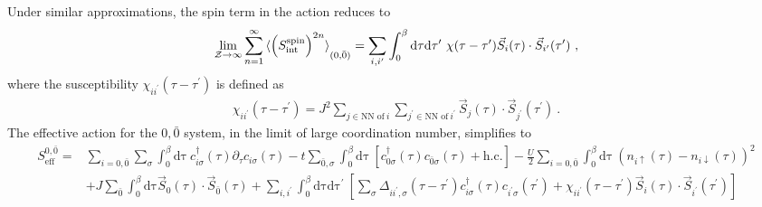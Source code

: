\documentclass[reprint,hidelinks,onecolumn]{revtex4-2}
\begin{document}
Under similar approximations, the spin term in the action reduces to
\begin{equation}\begin{aligned}
	\lim_{\mathcal{Z}\to \infty}\sum_{n=1}^\infty \braket{\left(S_\text{int}^\text{spin}\right)^{2n}}_{(0,{\bar 0})} = \sum_{i,i^\prime}\int_0^\beta\mathrm{d\tau}\mathrm{d\tau^\prime}~\chi(\tau - \tau^\prime)\vec{S}_{i}(\tau)\cdot\vec{S}_{i^\prime}(\tau^\prime)~,
\end{aligned}\end{equation}
where the susceptibility \(\chi_{ii^\prime}(\tau - \tau^\prime)\) is defined as 
\begin{equation}\begin{aligned}
	\chi_{ii^\prime}(\tau - \tau^\prime) = J^2\sum_{j \in \text{NN of}~i}\sum_{j^\prime \in \text{NN of}~i^\prime}\vec{S}_{j}(\tau)\cdot\vec{S}_{j^\prime}(\tau^\prime)~.
\end{aligned}\end{equation}
The effective action for the \(0,\bar 0\) system, in the limit of large coordination number, simplifies to
\begin{equation}\begin{aligned}
	S^{0,{\bar 0}}_\text{eff} =& \sum_{i=0,{\bar 0}}\sum_\sigma \int_0^\beta\mathrm{d\tau}~c^\dagger_{i\sigma}(\tau)\partial_\tau c_{i\sigma}(\tau)  - t\sum_{{\bar 0},\sigma}\int_0^\beta\mathrm{d\tau}~\left[c^\dagger_{0\sigma}(\tau)c_{{\bar 0}\sigma}(\tau) + \text{h.c.}\right] - \frac{U}{2}\sum_{i=0,{\bar 0}}\int_0^\beta\mathrm{d\tau}~\left(n_{i \uparrow}(\tau) - n_{i \downarrow}(\tau)\right)^2 \\
				   &+ J\sum_{{\bar 0}}\int_0^\beta\mathrm{d\tau} \vec{S}_0(\tau)\cdot\vec{S}_{{\bar 0}}(\tau) + \sum_{i,i^\prime}\int_0^\beta\mathrm{d\tau}\mathrm{d\tau^\prime}~\left[\sum_{\sigma}\Delta_{ii^\prime,\sigma}(\tau - \tau^\prime)c^\dagger_{i\sigma}(\tau)c_{i^\prime\sigma}(\tau^\prime) + \chi_{ii^\prime}(\tau - \tau^\prime)\vec{S}_{i}(\tau)\cdot\vec{S}_{i^\prime}(\tau^\prime)\right]
\end{aligned}\end{equation}
\end{document}
